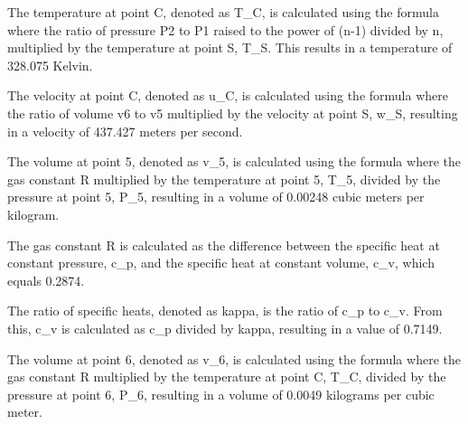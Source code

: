 The temperature at point C, denoted as T_C, is calculated using the formula where the ratio of pressure P2 to P1 raised to the power of (n-1) divided by n, multiplied by the temperature at point S, T_S. This results in a temperature of 328.075 Kelvin.

The velocity at point C, denoted as u_C, is calculated using the formula where the ratio of volume v6 to v5 multiplied by the velocity at point S, w_S, resulting in a velocity of 437.427 meters per second.

The volume at point 5, denoted as v_5, is calculated using the formula where the gas constant R multiplied by the temperature at point 5, T_5, divided by the pressure at point 5, P_5, resulting in a volume of 0.00248 cubic meters per kilogram.

The gas constant R is calculated as the difference between the specific heat at constant pressure, c_p, and the specific heat at constant volume, c_v, which equals 0.2874.

The ratio of specific heats, denoted as kappa, is the ratio of c_p to c_v. From this, c_v is calculated as c_p divided by kappa, resulting in a value of 0.7149.

The volume at point 6, denoted as v_6, is calculated using the formula where the gas constant R multiplied by the temperature at point C, T_C, divided by the pressure at point 6, P_6, resulting in a volume of 0.0049 kilograms per cubic meter.